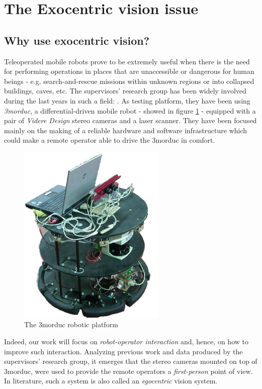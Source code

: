 \section{The Exocentric vision issue}
\label{sec:exo}
\subsection{Why use exocentric vision?}
Teleoperated mobile robots prove to be extremely useful 
when there is the need for performing operations in places that 
are unaccessible or dangerous for human beings - e.g. 
search-and-rescue missions within unknown regions or into 
collapsed buildings, caves, etc.
%
The supervisors' research group has been widely involved 
during the last years in such a field: \cite{livatino2010}.
%
As testing platform, they have been using \textit{3morduc},
a differential-driven mobile robot - showed in figure \ref{fig:3morduc} -
equipped with a pair of \textit{Videre Design} \cite{videredesign} 
stereo cameras and a laser scanner. They have been focused 
mainly on the making of a reliable hardware and software 
infrastructure which could make a remote operator able to drive 
the 3morduc in comfort.
%
\begin{figure}[!h]
  \begin{center}
    \includegraphics[width=200pt]{img/3morduc.jpg}  %
    \caption{The 3morduc robotic platform}
    \label{fig:3morduc}
  \end{center}
\end{figure}
%
Indeed, our work will focus on \textit{robot-operator interaction} and, 
hence, on how to improve such interaction. 
%
Analyzing previous work and data produced by the supervisors' 
research group, it emerges that the stereo cameras mounted on 
top of 3morduc, were used to provide the remote operators a 
\textit{first-person} point of view. In literature, such a 
system is also called an \textit{egocentric} vision system.
%

